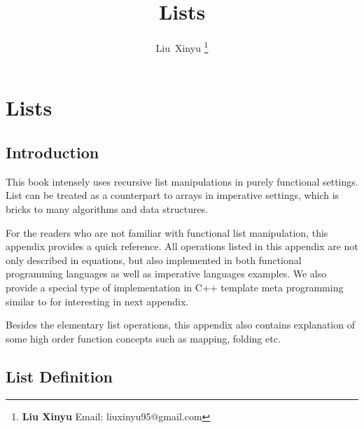 \documentclass{article}
\begin{document}
\fi


\title{Lists}

\author{Liu~Xinyu
\thanks{{\bfseries Liu Xinyu } \newline
  Email: liuxinyu95@gmail.com \newline}
  }


\maketitle

\ifx\wholebook\relax
\chapter{Lists}
\fi

\section{Introduction}
\label{introduction}
This book intensely uses recursive list manipulations in purely functional settings.
List can be treated as a counterpart to arrays in imperative settings, which is
bricks to many algorithms and data structures.

For the readers who are not familiar with functional list manipulation, this appendix
provides a quick reference. All operations listed in this appendix are not only
described in equations, but also implemented in both functional programming languages
as well as imperative languages examples. We also provide a special type of
implementation in C++ template meta programming similar to \cite{moderncxx}
for interesting in next appendix.

Besides the elementary list operations, this appendix also contains explanation of 
some high order function concepts such as mapping, folding etc.


\section{List Definition}
\end{document}
